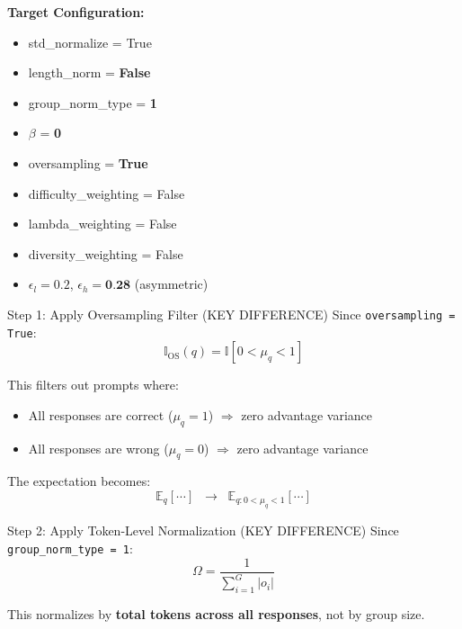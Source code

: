 \documentclass[11pt,a4paper]{article}
\begin{document}
\begin{configbox}
\textbf{Target Configuration:}
\begin{itemize}[noitemsep]
    \item std\_normalize = True
    \item length\_norm = \textbf{False}
    \item group\_norm\_type = \textbf{1}
    \item $\beta$ = \textbf{0}
    \item oversampling = \textbf{True}
    \item difficulty\_weighting = False
    \item lambda\_weighting = False
    \item diversity\_weighting = False
    \item $\epsilon_l = 0.2$, $\epsilon_h = \textbf{0.28}$ (asymmetric)
\end{itemize}
\end{configbox}

\begin{proofbox}{Step 1: Apply Oversampling Filter (KEY DIFFERENCE)}
Since \texttt{oversampling = True}:
\begin{equation}
\mathbb{I}_{\text{OS}}(q) = \mathbb{I}[0 < \mu_q < 1]
\end{equation}

This filters out prompts where:
\begin{itemize}
    \item All responses are correct ($\mu_q = 1$) $\Rightarrow$ zero advantage variance
    \item All responses are wrong ($\mu_q = 0$) $\Rightarrow$ zero advantage variance
\end{itemize}

The expectation becomes:
\begin{equation}
\mathbb{E}_{q}[\cdots] \;\;\longrightarrow\;\; \mathbb{E}_{q: 0 < \mu_q < 1}[\cdots]
\end{equation}
\end{proofbox}

\begin{proofbox}{Step 2: Apply Token-Level Normalization (KEY DIFFERENCE)}
Since \texttt{group\_norm\_type = 1}:
\begin{equation}
\Omega = \frac{1}{\sum_{i=1}^G |o_i|}
\end{equation}

This normalizes by \textbf{total tokens across all responses}, not by group size.
\end{proofbox}
\end{document}
